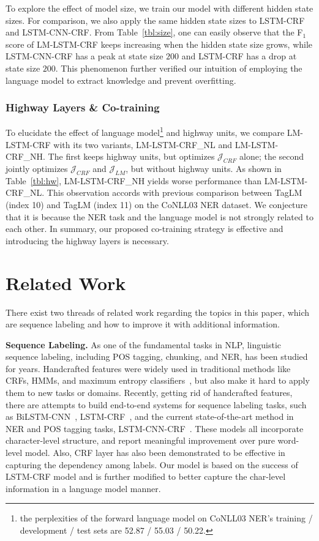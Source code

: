 \documentclass[letterpaper]{article} %
\newcommand{\our}{\textsc{LM-LSTM-CRF}\xspace}
\newcommand{\ournl}{\textsc{LM-LSTM-CRF\_NL}\xspace}
\newcommand{\ournh}{\textsc{LM-LSTM-CRF\_NH}\xspace}
\begin{document}
    To explore the effect of model size, we train our model with different hidden state sizes.
    For comparison, we also apply the same hidden state sizes to LSTM-CRF and LSTM-CNN-CRF.
    From Table~\ref{tbl:size}, one can easily observe that the F$_1$ score of \our keeps increasing when the hidden state size grows, while LSTM-CNN-CRF has a peak at state size $200$ and LSTM-CRF has a drop at state size $200$. 
    This phenomenon further verified our intuition of employing the language model to extract knowledge and prevent overfitting.

    \subsubsection{Highway Layers \& Co-training}

    To elucidate the effect of language model\footnote{the perplexities of the forward language model on CoNLL03 NER's training / development / test sets are 52.87 / 55.03 / 50.22.} and highway units, we compare \our with its two variants, \ournl and \ournh.
    The first keeps highway units, but optimizes $\mathcal{J}_{CRF}$ alone; the second jointly optimizes $\mathcal{J}_{CRF}$ and $\mathcal{J}_{LM}$, but without highway units.
    As shown in Table~\ref{tbl:hw}, \ournh yields worse performance than \ournl.
    This observation accords with previous comparison between TagLM (index 10) and TagLM (index 11) on the CoNLL03 NER dataset.
    We conjecture that it is because the NER task and the language model is not strongly related to each other.
    In summary, our proposed co-training strategy is effective and introducing the highway layers is necessary. 

\section{Related Work}
\label{sect:rel}

There exist two threads of related work regarding the topics in this paper, which are sequence labeling and how to improve it with additional information. 

\noindent\textbf{Sequence Labeling.}
As one of the fundamental tasks in NLP, linguistic sequence labeling, including POS tagging, chunking, and NER, has been studied for years.
Handcrafted features were widely used in traditional methods like CRFs, HMMs, and maximum entropy classifiers~\cite{Lafferty2001ConditionalRF,McCallum2003EarlyRF,Florian2003NamedER,Chieu2002NamedER}, but also make it hard to apply them to new tasks or domains.
Recently, getting rid of handcrafted features, there are attempts to build end-to-end systems for sequence labeling tasks, such as BiLSTM-CNN~\cite{Chiu2016NamedER}, LSTM-CRF~\cite{2016naacl}, and the current state-of-the-art method in NER and POS tagging tasks, LSTM-CNN-CRF~\cite{ma-hovy:2016:P16-1}.
These models all incorporate character-level structure, and report meaningful improvement over pure word-level model.
Also, CRF layer has also been demonstrated to be effective in capturing the dependency among labels.
Our model is based on the success of LSTM-CRF model and is further modified to better capture the char-level information in a language model manner.
\end{document}
